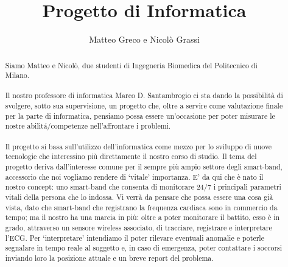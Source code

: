 \documentclass[a4paper, 12pt]{article}
\author{Matteo Greco e Nicol\`o Grassi}
\title{\bf{Progetto di Informatica}}
\date{}
\begin{document}
\maketitle
\begin{abstract}
Siamo Matteo e Nicol\`o, due studenti di Ingegneria Biomedica del Politecnico di Milano.\\\\Il nostro professore di informatica Marco D. Santambrogio ci sta dando la possibilit\`a di svolgere, sotto sua supervisione, un progetto che, oltre a servire come valutazione finale per la parte di informatica, pensiamo possa essere un'occasione per poter misurare le nostre abilit\'a/competenze nell'affrontare i problemi.\\\\
Il progetto si basa sull'utilizzo dell'informatica come mezzo per lo sviluppo di nuove tecnologie che interessino pi\`u direttamente il nostro corso di studio.
Il tema del progetto deriva dall'interesse comune per il sempre pi\`u ampio settore degli smart-band, accessorio che noi vogliamo rendere di `vitale' importanza. E' da qui che \`e nato il nostro concept: uno smart-band che consenta di monitorare 24/7 i principali parametri vitali della persona che lo indossa. Vi verr\`a da pensare che possa essere una cosa gi\`a vista, dato che smart-band che registrano la frequenza cardiaca sono in commercio da tempo; ma il nostro ha una marcia in pi\`u: oltre a poter monitorare il battito, esso \`e in grado, attraverso un sensore wireless associato, di tracciare, registrare e interpretare l'ECG. Per `interpretare'  intendiamo il poter rilevare eventuali anomalie e poterle segnalare in tempo reale al soggetto e, in caso di emergenza, poter contattare i soccorsi inviando loro la posizione attuale e un breve report del problema.
\end{abstract}
\end{document}

